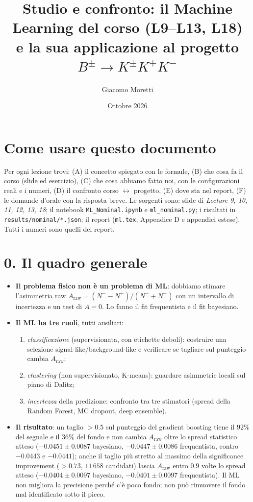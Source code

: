 \documentclass[11pt,a4paper]{article}
\title{Studio e confronto: il Machine Learning del corso (L9--L13, L18)\\e la sua applicazione al progetto $B^\pm\to K^\pm K^+K^-$}
\author{Giacomo Moretti}
\date{Ottobre 2026}
\newcommand{\Araw}{A_{\mathrm{raw}}}
\newcommand{\code}[1]{\texttt{#1}}
\begin{document}
\maketitle

\section*{Come usare questo documento}
Per ogni lezione trovi: (A) il concetto spiegato con le formule, (B) che cosa fa il corso (slide ed esercizio), (C) che cosa abbiamo fatto noi, con le configurazioni reali e i numeri, (D) il confronto corso $\leftrightarrow$ progetto, (E) dove sta nel report, (F) le domande d'orale con la risposta breve.
Le sorgenti sono: slide di \emph{Lecture 9, 10, 11, 12, 13, 18}; il notebook \code{ML\_Nominal.ipynb} e \code{ml\_nominal.py}; i risultati in \code{results/nominal/*.json}; il report (\code{ml.tex}, Appendice D e appendici estese).
Tutti i numeri sono quelli del report.

\section*{0. Il quadro generale}
\begin{itemize}
\item \textbf{Il problema fisico non \`e un problema di ML}: dobbiamo stimare l'asimmetria raw $\Araw=(N^--N^+)/(N^-+N^+)$ con un intervallo di incertezza e un test di $A=0$. Lo fanno il fit frequentista e il fit bayesiano.
\item \textbf{Il ML ha tre ruoli}, tutti ausiliari:
 \begin{enumerate}
 \item \emph{classificazione} (supervisionata, con etichette deboli): costruire una selezione signal-like/background-like e verificare se tagliare sul punteggio cambia $\Araw$;
 \item \emph{clustering} (non supervisionato, K-means): guardare asimmetrie locali sul piano di Dalitz;
 \item \emph{incertezza} della predizione: confronto tra tre stimatori (spread della Random Forest, MC dropout, deep ensemble).
 \end{enumerate}
\item \textbf{Il risultato}: un taglio $>0.5$ sul punteggio del gradient boosting tiene il $92\%$ del segnale e il $36\%$ del fondo e non cambia $\Araw$ oltre lo spread statistico atteso ($-0.0451\pm0.0087$ bayesiano, $-0.0447\pm0.0086$ frequentista, contro $-0.0443$ e $-0.0441$); anche il taglio pi\`u stretto al massimo della significance improvement ($>0.73$, $11\,658$ candidati) lascia $\Araw$ entro $0.9$ volte lo spread atteso ($-0.0404\pm0.0097$ bayesiano, $-0.0401\pm0.0097$ frequentista). Il ML non migliora la precisione perch\'e c'\`e poco fondo; non pu\`o rimuovere il fondo mal identificato sotto il picco.
\end{itemize}
\end{document}
